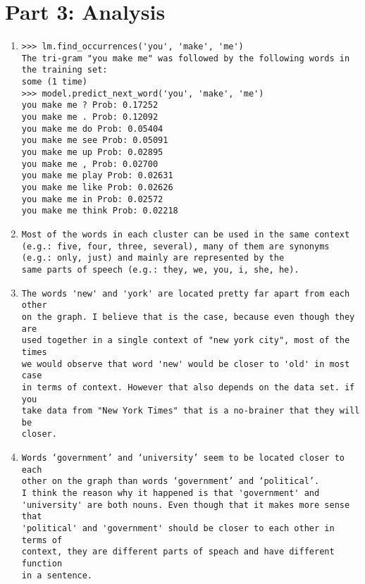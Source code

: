\documentclass{article}
\begin{document}
\section{Part 3: Analysis}
\begin{enumerate}
    \item
    \begin{verbatim}
>>> lm.find_occurrences('you', 'make', 'me')
The tri-gram "you make me" was followed by the following words in the training set:
some (1 time)
>>> model.predict_next_word('you', 'make', 'me')
you make me ? Prob: 0.17252
you make me . Prob: 0.12092
you make me do Prob: 0.05404
you make me see Prob: 0.05091
you make me up Prob: 0.02895
you make me , Prob: 0.02700
you make me play Prob: 0.02631
you make me like Prob: 0.02626
you make me in Prob: 0.02572
you make me think Prob: 0.02218
 \end{verbatim}
    \item
    \begin{verbatim}
Most of the words in each cluster can be used in the same context
(e.g.: five, four, three, several), many of them are synonyms 
(e.g.: only, just) and mainly are represented by the 
same parts of speech (e.g.: they, we, you, i, she, he).
    \end{verbatim}
    \item
    \begin{verbatim}
The words 'new' and 'york' are located pretty far apart from each other 
on the graph. I believe that is the case, because even though they are 
used together in a single context of "new york city", most of the times
we would observe that word 'new' would be closer to 'old' in most case
in terms of context. However that also depends on the data set. if you
take data from "New York Times" that is a no-brainer that they will be 
closer.    
    \end{verbatim}
    \item
    \begin{verbatim}
Words ‘government’ and ‘university’ seem to be located closer to each
other on the graph than words ‘government’ and ‘political’. 
I think the reason why it happened is that 'government' and 
'university' are both nouns. Even though that it makes more sense that
'political' and 'government' should be closer to each other in terms of
context, they are different parts of speach and have different function
in a sentence. 
    
    \end{verbatim}
  
\end{enumerate}




    
\end{document}
